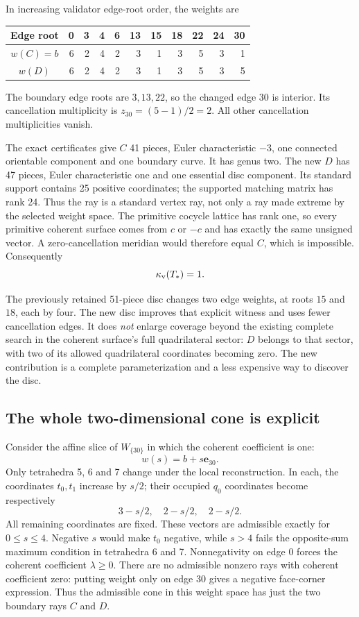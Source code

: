 In increasing validator edge-root order, the weights are
\begin{center}
\small
\begin{tabular}{@{}c rrrrrrrrrr@{}}
\toprule
Edge root &0&3&4&6&13&15&18&22&24&30\\
\midrule
$w(C)=b$ &6&2&4&2&3&1&3&5&3&1\\
$w(D)$   &6&2&4&2&3&1&3&5&3&5\\
\bottomrule
\end{tabular}
\end{center}
The boundary edge roots are $3,13,22$, so the changed edge $30$ is
interior. Its cancellation multiplicity is $z_{30}=(5-1)/2=2$.
All other cancellation multiplicities vanish.

The exact certificates give $C$ 41 pieces, Euler characteristic $-3$,
one connected orientable component and one boundary curve. It has genus
two. The new $D$ has 47 pieces, Euler characteristic one and one essential
disc component. Its standard support contains 25 positive coordinates;
the supported matching matrix has rank 24. Thus the ray is a standard
vertex ray, not only a ray made extreme by the selected weight space.
The primitive cocycle lattice has rank one, so every primitive coherent
surface comes from $c$ or $-c$ and has exactly the same unsigned vector.
A zero-cancellation meridian would therefore equal $C$, which is
impossible. Consequently
\[
                             \kappa_{\mathrm{v}}(T_*)=1.
\]

The previously retained 51-piece disc changes two edge weights, at roots
$15$ and $18$, each by four. The new disc improves that explicit witness
and uses fewer cancellation edges. It does \emph{not} enlarge coverage
beyond the existing complete search in the coherent surface's full
quadrilateral sector: $D$ belongs to that sector, with two of its allowed
quadrilateral coordinates becoming zero. The new contribution is a
complete parameterization and a less expensive way to discover the disc.

\subsection{The whole two-dimensional cone is explicit}

Consider the affine slice of $W_{\{30\}}$ in which the coherent coefficient
is one:
\[
                         w(s)=b+s\mathbf e_{30}.
\]
Only tetrahedra 5, 6 and 7 change under the local reconstruction. In each,
the coordinates $t_0,t_1$ increase by $s/2$; their occupied $q_0$
coordinates become respectively
\[
                         3-s/2,\quad 2-s/2,\quad 2-s/2.
\]
All remaining coordinates are fixed. These vectors are admissible exactly
for $0\le s\le4$. Negative $s$ would make $t_0$ negative, while $s>4$
fails the opposite-sum maximum condition in tetrahedra 6 and 7.
Nonnegativity on edge $0$ forces the coherent coefficient $\lambda\ge0$.
There are no admissible nonzero rays with coherent coefficient zero:
putting weight only on edge $30$ gives a negative face-corner expression.
Thus the admissible cone in this weight space has just the two boundary
rays $C$ and $D$.


